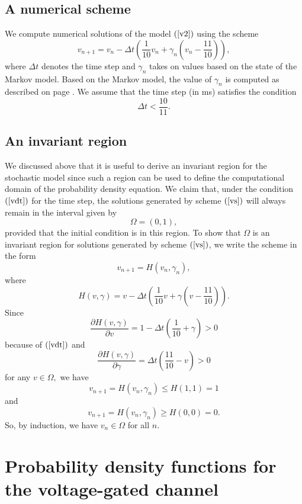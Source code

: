 \subsection{A numerical scheme}

We compute numerical solutions of the model $\left(  \ref{v2}\right)  $ using
the scheme%
\begin{equation}
v_{n+1}=v_{n}-\Delta t\left(  \frac{1}{10}v_{n}+\gamma_{n}\left(  v_{n}%
-\frac{11}{10}\right)  \right)  \label{vs},%
\end{equation}
where $\Delta t$ denotes the time step and $\gamma_{n}$ takes on values
based on the state of the Markov model. Based on the Markov model, the value
of $\gamma_{n}$ is computed as described on page \pageref{numscheme}. We assume that
the time step (in ms) satisfies the condition%
\begin{equation}
\Delta t<\frac{10}{11}. \label{vdt}%
\end{equation}



\subsection{An invariant region}

We discussed above that it is useful to derive an invariant region for the
stochastic model since such a region can be used to define the computational
domain of the probability density equation. We claim that, under the condition
$\left(  \ref{vdt}\right)  $ for the time step, the solutions generated by 
scheme $\left(  \ref{vs}\right)  $ will always remain in the interval given by%
\[
\Omega=(0,1),
\]
provided that the initial condition is in this region. To show that
$\Omega$ is an invariant region for solutions generated by scheme $\left(
\ref{vs}\right)  $, we write the scheme in the form%
\[
v_{n+1}=H(v_{n},\gamma_{n}),
\]
where%
\[
H(v,\gamma)=v-\Delta t\left(  \frac{1}{10}v+\gamma\left(  v-\frac{11}%
{10}\right)  \right)  .
\]
Since%
\[
\frac{\partial H(v,\gamma)}{\partial v}=1-\Delta t\left(  \frac{1}{10}%
+\gamma\right)  >0
\]
because of $\left(  \ref{vdt}\right) $ and%
\[
\frac{\partial H(v,\gamma)}{\partial\gamma}=\Delta t\left(\frac{11}{10}-v\right)>0
\]
for any $v\in\Omega,$ we have%
\[
v_{n+1}=H(v_{n},\gamma_{n})\leqslant H\left(  1,1\right)  =1
\]
and%
\[
v_{n+1}=H(v_{n},\gamma_{n})\geqslant H(0,0)=0.
\]
So, by induction, we have  $v_{n}\in\Omega$  for all $n$.



\section[Probability density functions]{Probability density functions for the voltage-gated channel}

